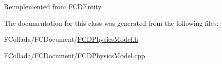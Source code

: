 Reimplemented from \hyperlink{classFCDEntity_abfd4312a7124f92364c1e6517c7e60ba}{FCDEntity}.



The documentation for this class was generated from the following files:\begin{DoxyCompactItemize}
\item 
FCollada/FCDocument/\hyperlink{FCDPhysicsModel_8h}{FCDPhysicsModel.h}\item 
FCollada/FCDocument/FCDPhysicsModel.cpp\end{DoxyCompactItemize}
